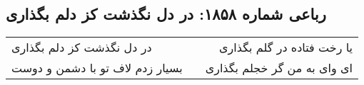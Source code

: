\begin{center}
\section*{رباعی شماره ۱۸۵۸: در دل نگذشت کز دلم بگذاری}
\label{sec:1858}
\begin{longtable}{l p{0.5cm} r}
در دل نگذشت کز دلم بگذاری
&&
یا رخت فتاده در گلم بگذاری
\\
بسیار زدم لاف تو با دشمن و دوست
&&
ای وای به من گر خجلم بگذاری
\\
\end{longtable}
\end{center}
